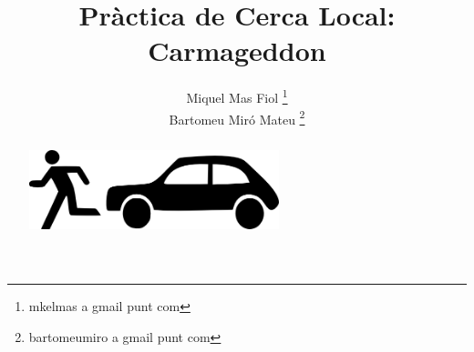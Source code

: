 \documentclass[a4paper,11pt]{scrartcl}
\title{Pràctica de Cerca Local: \\ \huge{Carmageddon}}
\author{ Miquel Mas Fiol \thanks{mkelmas a gmail punt com} \\
	 Bartomeu Miró Mateu \thanks{bartomeumiro a gmail punt com} \\}
\begin{document}
  \maketitle

  \begin{abstract}
    \begin{center}
      \includegraphics[width=0.6\textwidth]{figures/carmageddon-logo.png}
    \end{center}
  \end{abstract}

  \newpage
  \setcounter{page}{2}
  \tableofcontents
  \newpage

  
  \newpage
  
  \newpage
  
  \newpage
  
  

  
\end{document}
